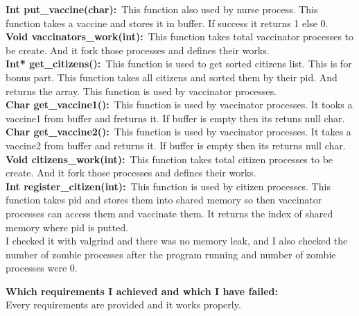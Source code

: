 \documentclass[a4 paper]{article}
\begin{document}
\textbf{Int put\_vaccine(char):}\newline\
\phantom{beta}This function also used by nurse process. This function takes a vaccine and stores it in buffer. If success it returns 1 else 0.\newline\\

\textbf{Void vaccinators\_work(int):}\newline\
\phantom{beta}This function takes total vaccinator processes to be create. And it fork those processes and defines their works.\newline\\

\textbf{Int* get\_citizens():}\newline\
\phantom{beta}This function is used to get sorted citizens list. This is for bonus part. This function takes all citizens and sorted them by their pid. And returns the array.  This function is used by vaccinator processes.\newline\\

\textbf{Char get\_vaccine1():}\newline\
\phantom{beta}This function is used by vaccinator processes. It tooks a vaccine1 from buffer and freturns it. If buffer is empty then its retuns null char.\newline\\

\textbf{Char get\_vaccine2():}\newline\
\phantom{beta}This function is used by vaccinator processes. It takes a vaccine2 from buffer and returns it. If buffer is empty then its returns null char.\newline\\


\textbf{Void citizens\_work(int):}\newline\
\phantom{beta}This function takes total citizen processes to be create. And it fork those processes and defines their works.\newline\\

\textbf{Int register\_citizen(int):}\newline\
\phantom{beta}This function is used by citizen processes. This function takes pid and stores them into shared memory so then vaccinator processes can access them and vaccinate them. It returns the index of shared memory where pid is putted.\newline\\


I checked it with valgrind and there was no memory leak, and I also checked the number of zombie processes after the program running and number of zombie processes were 0.\newline

{\color{red}\large\textbf {Which requirements I achieved and which I have failed:}}\newline\\
\phantom{beta}Every requirements are provided and it works properly.
\end{document}
